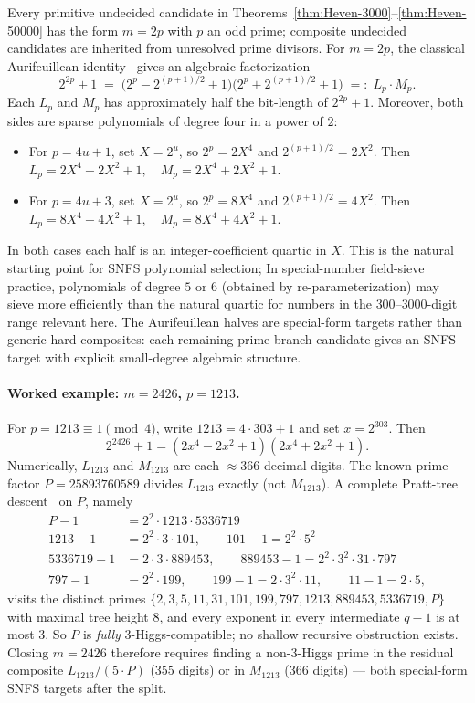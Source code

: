 \documentclass[11pt]{amsart}
\theoremstyle{plain}
\theoremstyle{definition}
\begin{document}
Every primitive undecided candidate in
Theorems~\ref{thm:Heven-3000}--\ref{thm:Heven-50000}
has the form $m = 2p$ with $p$ an odd prime; composite undecided
candidates are inherited from unresolved prime divisors. For $m=2p$,
the classical Aurifeuillean
identity~\cite{Wagstaff2002} gives an algebraic factorization
\begin{equation}\label{eq:Aurifeuillean}
2^{2p} + 1
\;=\;
\bigl(2^p - 2^{(p+1)/2} + 1\bigr)
\bigl(2^p + 2^{(p+1)/2} + 1\bigr)
\;=:\; L_p \cdot M_p.
\end{equation}
Each $L_p$ and $M_p$ has approximately half the bit-length of
$2^{2p}+1$. Moreover, both sides are sparse polynomials of degree
four in a power of $2$:
\begin{itemize}
\item For $p = 4u+1$, set $X = 2^u$, so $2^p = 2X^4$ and
$2^{(p+1)/2} = 2X^2$. Then
$L_p = 2X^4 - 2X^2 + 1, \quad M_p = 2X^4 + 2X^2 + 1$.
\item For $p = 4u+3$, set $X = 2^u$, so $2^p = 8X^4$ and
$2^{(p+1)/2} = 4X^2$. Then
$L_p = 8X^4 - 4X^2 + 1, \quad M_p = 8X^4 + 4X^2 + 1$.
\end{itemize}
In both cases each half is an integer-coefficient quartic in $X$.
This is the natural starting point for SNFS polynomial selection;
In special-number field-sieve practice, polynomials of
degree $5$ or $6$ (obtained by re-parameterization) may sieve
more efficiently than the natural quartic for numbers in the
$300$--$3000$-digit range relevant here. The Aurifeuillean halves are special-form targets rather than
generic hard composites: each remaining prime-branch candidate gives
an SNFS target with explicit small-degree algebraic structure.

\paragraph{Worked example: $m = 2426$, $p = 1213$.}
For $p = 1213 \equiv 1 \pmod 4$, write $1213 = 4 \cdot 303 + 1$ and
set $x = 2^{303}$. Then
\[
2^{2426}+1 = (2x^4 - 2x^2 + 1)(2x^4 + 2x^2 + 1).
\]
Numerically, $L_{1213}$ and $M_{1213}$ are each $\approx 366$ decimal
digits. The known prime factor $P = 25893760589$ divides $L_{1213}$
exactly (not $M_{1213}$). A complete Pratt-tree descent~\cite{Ford2014}
on $P$, namely
\begin{align*}
P-1 &= 2^2 \cdot 1213 \cdot 5336719 \\
1213-1 &= 2^2 \cdot 3 \cdot 101, \qquad 101-1 = 2^2 \cdot 5^2 \\
5336719-1 &= 2 \cdot 3 \cdot 889453, \qquad 889453-1 = 2^2 \cdot 3^2 \cdot 31 \cdot 797 \\
797-1 &= 2^2 \cdot 199, \qquad 199-1 = 2 \cdot 3^2 \cdot 11, \qquad 11-1 = 2 \cdot 5,
\end{align*}
visits the distinct primes
$\{2,3,5,11,31,101,199,797,1213,889453,5336719,P\}$ with maximal
tree height $8$, and every exponent in every intermediate $q-1$ is at
most $3$. So $P$ is \emph{fully} 3-Higgs-compatible; no shallow
recursive obstruction exists. Closing $m = 2426$ therefore requires
finding a non-3-Higgs prime in the residual composite
$L_{1213} / (5 \cdot P)$ ($355$ digits) or in $M_{1213}$ ($366$
digits) --- both special-form SNFS targets after the split.
\end{document}
